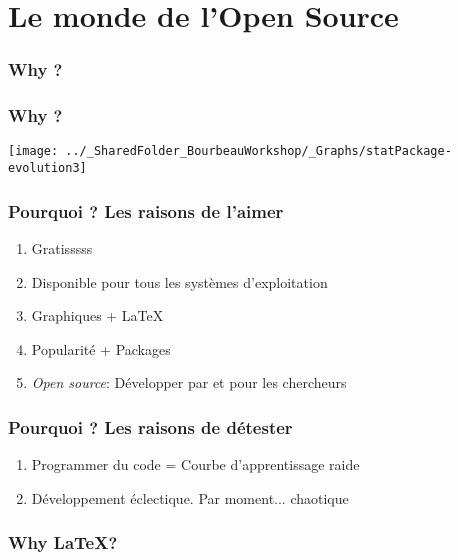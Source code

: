 \documentclass{beamer}
\begin{document}
\section{Le monde \vspace{0.3cm} de l'Open Source}

    \begin{frame}
        \frametitle{Why \R?}  \vspace{1.2cm}
    \end{frame}

    \begin{frame}
        \frametitle{Why \R?}  \vspace{1.2cm}
        \begin{center}
            \texttt{[image: ../\_SharedFolder\_BourbeauWorkshop/\_Graphs/statPackage-evolution3]}
        \end{center} 
    \end{frame}
    
    \begin{frame}
        \frametitle{Pourquoi \R? Les raisons de l'aimer}
        \begin{enumerate}
            \item{Gratisssss}
            \item{Disponible pour tous les systèmes d'exploitation}
            \item{Graphiques + \LaTeX}
            \item{Popularité + Packages}
            \item{\emph{Open source}: Développer par et pour les chercheurs}
        \end{enumerate}
    \end{frame}
    
    \begin{frame}
        \frametitle{Pourquoi \R? Les raisons de détester}
        \begin{enumerate}
            \item{Programmer du code = Courbe d'apprentissage raide}
            \item{Développement éclectique. Par moment... chaotique}
        \end{enumerate}
    \end{frame}
    


    \begin{frame}
        \frametitle{Why \LaTeX?} \vspace{1cm}   
    \end{frame}
    
\end{document}

